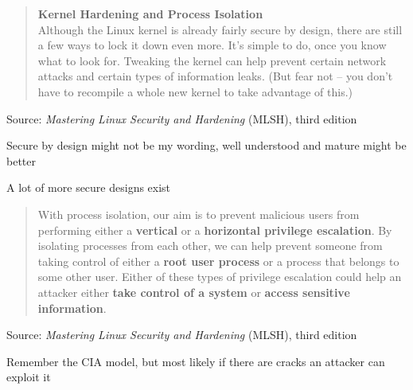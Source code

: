 \documentclass[Screen16to9,17pt]{foils}
\begin{document}

\begin{quote}{\bf
Kernel Hardening and Process Isolation}\\
Although the Linux kernel is already fairly secure by design, there are still a few ways to lock it down even more. It’s simple to do, once you know what to look for. Tweaking the kernel can help prevent certain network attacks and certain types of information leaks. (But fear not – you don’t have to recompile a whole new kernel to take advantage of this.)
\end{quote}
Source: \emph{Mastering Linux Security and Hardening} (MLSH), third edition

\begin{list2}
\item Secure by design might not be my wording, well understood and mature might be better
\item A lot of more secure designs exist
\end{list2}



\begin{quote}
With process isolation, our aim is to prevent malicious users from performing either a {\bf vertical} or a {\bf horizontal privilege escalation}. By isolating processes from each other, we can help prevent someone from taking control of either a {\bf root user process} or a process that belongs to some other user. Either of these types of privilege escalation could help an attacker either {\bf take control of a system} or {\bf access sensitive information}.
\end{quote}
Source: \emph{Mastering Linux Security and Hardening} (MLSH), third edition


\begin{list2}
\item Remember the CIA model, but most likely if there are cracks an attacker can exploit it
\end{list2}



\end{document}
